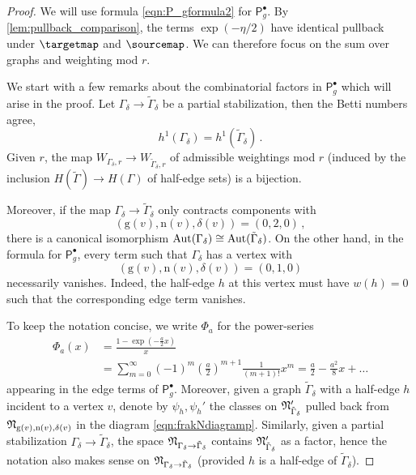 \documentclass[a4paper,12pt]{article} %
\def\P{\mathsf{P}}
\def\Aut{{\rm Aut}}
\def\n{\mathrm{n}}
\def\g{\mathrm{g}}
\theoremstyle{definition}
\theoremstyle{plain}%
\begin{document}
\begin{proof} 
We will use  formula \eqref{eqn:P_gformula2}
for $\P_g^\bullet$. By \cref{lem:pullback_comparison}, the terms $\exp(- \eta/2)$ have identical pullback under $\targetmap$ and $\sourcemap$. We can therefore
focus on the sum over graphs and weighting mod $r$. 

We start with a few remarks about the combinatorial factors in $\P_g^\bullet$ which will arise in the proof. Let $\Gamma_{\delta}\to\tilde{\Gamma}_{\delta}$ be a partial stabilization, then the Betti numbers agree,
$$h^1(\Gamma_\delta) = h^1(\tilde \Gamma_\delta)\, .$$
Given $r$, the map $W_{\Gamma_\delta,r} \to W_{\tilde \Gamma_\delta, r}$ of admissible weightings mod $r$ (induced by the inclusion $H(\tilde \Gamma) \to H(\Gamma)$ of half-edge sets) is a bijection. 

Moreover, if the map $\Gamma_{\delta}\to\tilde{\Gamma}_{\delta}$ only contracts components with $$(\g(v),\n(v),\delta(v))=(0,2,0)\,,$$ there is a canonical isomorphism $\Aut(\Gamma_\delta) \cong \Aut(\tilde \Gamma_\delta)$. On the other hand, in the formula for $\P_g^\bullet$, every term such that $\Gamma_\delta$ has a vertex with $$(\g(v), \n(v), \delta(v))=(0,1,0)$$ necessarily vanishes. Indeed, the half-edge $h$ at this vertex must have $w(h)=0$ such that the corresponding edge term vanishes. 

To keep the notation concise, we write $\Phi_{a}$ for the power-series 
\begin{align*} 
\Phi_{a}(x)&= \frac{1-\exp({-\frac{a}{2}}x)}{x}\\ &= \sum_{m=0}^\infty (-1)^m (\frac{a}{2})^{m+1} \frac{1}{(m+1)!}x^m = \frac{a}{2} - \frac{a^2}{8} x + \ldots 
\end{align*}
appearing in the edge terms of $\P_g^\bullet$. Moreover, given a graph $\tilde \Gamma_\delta$ with a half-edge $h$ incident to a vertex $v$, denote by $\psi_h, \psi_h'$ the classes on $\frak N'_{\tilde \Gamma_\delta}$ pulled back from $\frak N_{\g(v),\n(v),\delta(v)}$ in the diagram \eqref{eqn:frakNdiagramp}. Similarly, given a partial stabilization $\Gamma_\delta \to \tilde \Gamma_\delta$, the space $\frak N_{\Gamma_\delta \to \tilde \Gamma_\delta}$ contains $\frak N'_{\tilde \Gamma_\delta}$ as a factor, hence the notation also makes sense on $\frak N_{\Gamma_\delta \to \tilde \Gamma_\delta}$ (provided $h$ is a half-edge of $\tilde \Gamma_\delta$).


\end{proof}
\end{document}
